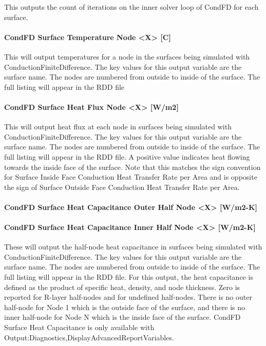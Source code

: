 This outputs the count of iterations on the inner solver loop of CondFD for each surface.

\paragraph{CondFD Surface Temperature Node \textless{}X\textgreater{} {[}C{]}}\label{condfd-surface-temperature-node-x-c}

This will output temperatures for a node in the surfaces being simulated with ConductionFiniteDifference. The key values for this output variable are the surface name. The nodes are numbered from outside to inside of the surface. The full listing will appear in the RDD file

\paragraph{CondFD Surface Heat Flux Node \textless{}X\textgreater{} {[}W/m2{]}}\label{condfd-surface-heat-flux-node-x-wm2}

This will output heat flux at each node in surfaces being simulated with ConductionFiniteDifference. The key values for this output variable are the surface name. The nodes are numbered from outside to inside of the surface. The full listing will appear in the RDD file. A positive value indicates heat flowing towards the inside face of the surface. Note that this matches the sign convention for Surface Inside Face Conduction Heat Transfer Rate per Area and is opposite the sign of Surface Outside Face Conduction Heat Transfer Rate per Area.

\paragraph{CondFD Surface Heat Capacitance Outer Half Node \textless{}X\textgreater{} {[}W/m2-K{]}}\label{condfd-surface-heat-capacitance-outer-half-node-x-wm2-k}

\paragraph{CondFD Surface Heat Capacitance Inner Half Node \textless{}X\textgreater{} {[}W/m2-K{]}}\label{condfd-surface-heat-capacitance-inner-half-node-x-wm2-k}

These will output the half-node heat capacitance in surfaces being simulated with ConductionFiniteDifference. The key values for this output variable are the surface name. The nodes are numbered from outside to inside of the surface. The full listing will appear in the RDD file. For this output, the heat capacitance is defined as the product of specific heat, density, and node thickness. Zero is reported for R-layer half-nodes and for undefined half-nodes. There is no outer half-node for Node 1 which is the outside face of the surface, and there is no inner half-node for Node N which is the inside face of the surface. CondFD Surface Heat Capacitance is only available with Output:Diagnostics,DisplayAdvancedReportVariables.

